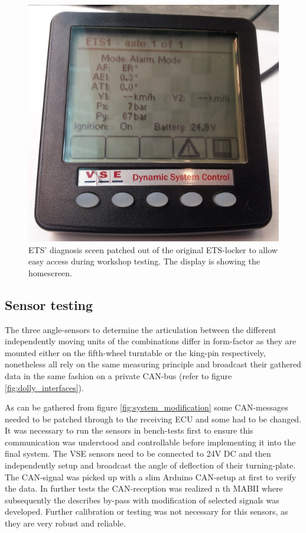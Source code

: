 \documentclass[ExampleMasters.tex]{subfiles}
\begin{document}
\begin{figure}[h]
\centering
\includegraphics[width=0.6\linewidth]{figures/ETS_display_homescreen}
\caption{\gls{ETS}' diagnosis sceen patched out of the original ETS-locker to allow easy access during workshop testing. The display is showing the homescreen.}
\label{fig:ETS_display_homescreen}
\end{figure}


\subsection{Sensor testing}

The three angle-sensors to determine the articulation between the different independently moving units of the combinations differ in form-factor as they are mounted either on the fifth-wheel turntable or the king-pin respectively, nonetheless all rely on the same measuring principle and broadcast their gathered data in the same fashion on a private \gls{CAN}-bus (refer to figure \ref{fig:dolly_interfaces}). 

As can be gathered from figure \ref{fig:system_modification} some CAN-messages needed to be patched through to the receiving \gls{ECU} and some had to be changed. It was necessary to run the sensors in bench-tests first to ensure this communication was understood and controllable before implementing it into the final system. The \gls{VSE} sensors need to be connected to 24V \gls{DC} and then independently setup and broadcast the angle of deflection of their turning-plate. The CAN-signal was picked up with a slim Arduino CAN-setup at first to verify the data. In further tests the \gls{CAN}-reception was realized n th \gls{MABII} where subsequently the describes by-pass with modification of selected signals was developed.%
Further calibration or testing was not necessary for this sensors, as they are very robust and reliable. 
\end{document}
